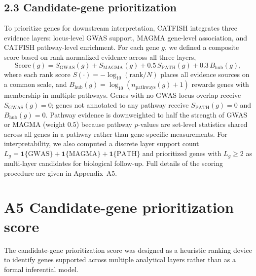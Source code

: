 \subsection{2.3 Candidate-gene prioritization}
To prioritize genes for downstream interpretation, CATFISH integrates three evidence
layers: locus-level GWAS support, MAGMA gene-level association, and CATFISH
pathway-level enrichment. For each gene $g$, we defined a composite score based on
rank-normalized evidence across all three layers,
\[
\mathrm{Score}(g)
= S_{\mathrm{GWAS}}(g)
+ S_{\mathrm{MAGMA}}(g)
+ 0.5\,S_{\mathrm{PATH}}(g)
+ 0.3\,B_{\mathrm{hub}}(g),
\]
where each rank score $S(\cdot) = -\log_{10}(\mathrm{rank}/N)$ places all evidence
sources on a common scale, and $B_{\mathrm{hub}}(g) = \log_{10}(n_{\mathrm{pathways}}(g)+1)$
rewards genes with membership in multiple pathways. Genes with no GWAS locus overlap
receive $S_{\mathrm{GWAS}}(g)=0$; genes not annotated to any pathway receive
$S_{\mathrm{PATH}}(g)=0$ and $B_{\mathrm{hub}}(g)=0$. Pathway evidence is downweighted
to half the strength of GWAS or MAGMA (weight $0.5$) because pathway $p$-values are
set-level statistics shared across all genes in a pathway rather than gene-specific
measurements. For interpretability, we also computed a discrete layer support count
$L_g = \mathbf{1}\{\mathrm{GWAS}\} + \mathbf{1}\{\mathrm{MAGMA}\} + \mathbf{1}\{\mathrm{PATH}\}$
and prioritized genes with $L_g \geq 2$ as multi-layer candidates for biological
follow-up. Full details of the scoring procedure are given in Appendix~A5.



\section{A5 Candidate-gene prioritization score}\label{app:candidate_score}

The candidate-gene prioritization score was designed as a heuristic ranking device to
identify genes supported across multiple analytical layers rather than as a formal
inferential model.

